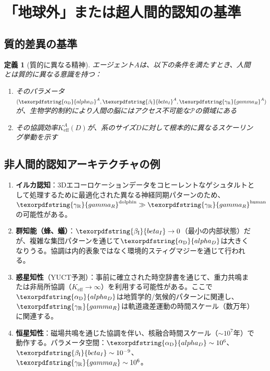 \documentclass[11pt,a4paper]{article}
\newtheorem{definition}{定義}
\DeclareRobustCommand{\alD}{\texorpdfstring{\ensuremath{\alpha_{\mathrm{D}}}}{alpha_D}}
\DeclareRobustCommand{\beI}{\texorpdfstring{\ensuremath{\beta_{\mathrm{I}}}}{beta_I}}
\DeclareRobustCommand{\gaR}{\texorpdfstring{\ensuremath{\gamma_{\mathrm{R}}}}{gamma_R}}
\newcommand{\eff}{\mathrm{eff}}
\newcommand{\Ke}{K_{\eff}}
\begin{document}
	\section{「地球外」または超人間的認知の基準}
	
	\subsection{質的差異の基準}
	
	\begin{definition}[質的に異なる精神]
		エージェント\(A\)は、以下の条件を満たすとき、人間とは質的に異なる意識を持つ：
		\begin{enumerate}
			\item そのパラメータ\((\alD^A, \beI^A, \gaR^A)\)が、生物学的制約により人間の脳にはアクセス不可能な\(\mathcal{P}\)の領域にある
			\item その協調効率\(\Ke^A(D)\)が、系のサイズ\(D\)に対して根本的に異なるスケーリング挙動を示す
		\end{enumerate}
	\end{definition}
	
	\subsection{非人間的認知アーキテクチャの例}
	
	\begin{enumerate}
		\item \textbf{イルカ認知}：3Dエコーロケーションデータをコヒーレントなゲシュタルトとして処理するために最適化された異なる神経同期パターンのため、\(\gaR^{\mathrm{dolphin}} \gg \gaR^{\mathrm{human}}\)の可能性がある。
		
		\item \textbf{群知能（蜂、蟻）}：\(\beI \to 0\)（最小の内部状態）だが、複雑な集団パターンを通じて\(\alD\)は大きくなりうる。協調は内的表象ではなく環境的スティグマジーを通じて行われる。
		
		\item \textbf{惑星知性}（YUCT予測）：事前に確立された時空辞書を通じて、重力共鳴または非局所協調（\(\Ke \to \infty\)）を利用する可能性がある。ここで\(\alD\)は地質学的/気候的パターンに関連し、\(\gaR\)は軌道歳差運動の時間スケール（数万年）に関連する。
		
		\item \textbf{恒星知性}：磁場共鳴を通じた協調を伴い、核融合時間スケール（\(\sim 10^7\)年）で動作する。パラメータ空間：\(\alD \sim 10^6\)、\(\beI \sim 10^{-9}\)、\(\gaR \sim 10^6\)。
	\end{enumerate}
	
\end{document}
